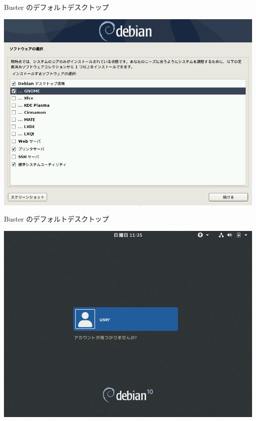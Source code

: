 \begin{frame}{Buster のデフォルトデスクトップ}

\begin{center}
\includegraphics[keepaspectratio,width=1\hsize]{image201907/buster_tasksel_1.png}
\end{center}

\end{frame}

\begin{frame}{Buster のデフォルトデスクトップ}

\begin{center}
\includegraphics[keepaspectratio,width=1\hsize]{image201907/buster_gdm3.png}
\end{center}

\end{frame}


